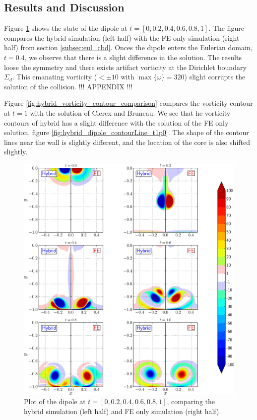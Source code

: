 \subsection{Results and Discussion}

Figure \ref{fig:hybrid_doubleMonolope_contourfComparison} shows the state of the dipole at $t=[0,0.2,0.4,0.6,0.8,1]$. The figure compares the hybrid simulation (left half) with the FE only simulation (right half) from section \ref{subsec:eul_cbd}. Onces the dipole enters the Eulerian domain, $t=0.4$, we observe that there is a slight difference in the solution. The results loose the symmetry and there exists artifact vorticity at the Dirichlet boundary $\Sigma_d$. This emanating vorticity ($<\pm10$ with $\max\{\omega\}=320$) slight corrupts the solution of the collision. !!! APPENDIX !!!

Figure \ref{fig:hybrid_vorticity_contour_comparison} compares the vorticity contour at $t=1$ with the solution of Clercx and Bruneau. We see that he vorticity contours of hybrid has a slight difference with the solution of the FE only solution, figure \ref{fig:hybrid_dipole_contourLine_t1p0}. The shape of the contour lines near the wall is slightly different, and the location of the core is also shifted slightly.

	\begin{figure}[!p]
	\showthe\columnwidth
	\centering
	\includegraphics[width=\linewidth]{./figures/hybrid/cbColl/hybrid_doubleMonolope_contourfComparisonNew_compressed-crop.png}
	\caption{Plot of the dipole at $t = [0, 0.2, 0.4, 0.6, 0.8, 1]$, comparing the hybrid simulation (left half) and FE only simulation (right half).}
	\label{fig:hybrid_doubleMonolope_contourfComparison}
	\end{figure}

